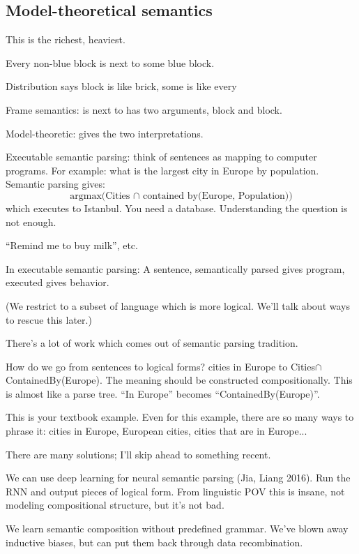 \subsection{Model-theoretical semantics}

This is the richest, heaviest.

Every non-blue block is next to some blue block.

Distribution says block is like brick, some is like every

Frame semantics: is next to has two arguments, block and block.

Model-theoretic: gives the two interpretations.

Executable semantic parsing: think of sentences as mapping to computer programs. For example: what is the largest city in Europe by population. Semantic parsing gives: 
$$\text{argmax(Cities $\cap$ contained by(Europe, Population))}$$
which executes to Istanbul.
You need a database. Understanding the question is not enough.


``Remind me to buy milk'', etc. 

In executable semantic parsing: A sentence, semantically parsed gives program, executed gives behavior.

(We restrict to a subset of language which is more logical. We'll talk about ways to rescue this later.)

There's a lot of work which comes out of semantic parsing tradition.

How do we go from sentences to logical forms? cities in Europe to Cities$\cap$ContainedBy(Europe). The meaning should be constructed compositionally.
This is almost like a parse tree. ``In Europe'' becomes ``ContainedBy(Europe)''. 

This is your textbook example. Even for this example, there are so many ways to phrase it: cities in Europe, European cities, cities that are in Europe...

There are many solutions; I'll skip ahead to something recent.

We can use deep learning for neural semantic parsing (Jia, Liang 2016). Run the RNN and output pieces of logical form. From linguistic POV this is insane, not modeling compositional structure, but it's not bad. 

We learn semantic composition without predefined grammar. We've blown away inductive biases, but can put them back through data recombination. 

